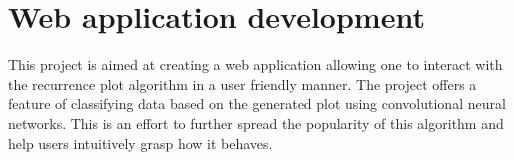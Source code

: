 \documentclass[a4paper,12pt,fleqn]{article}
\begin{document}









\section{Web application development}
This project is aimed at creating a web application allowing one to interact with the recurrence plot algorithm in a user friendly manner.
The project offers a feature of classifying data based on the generated plot using convolutional neural networks.
This is an effort to further spread the popularity of this algorithm and help users intuitively grasp how it behaves.
\end{document}
